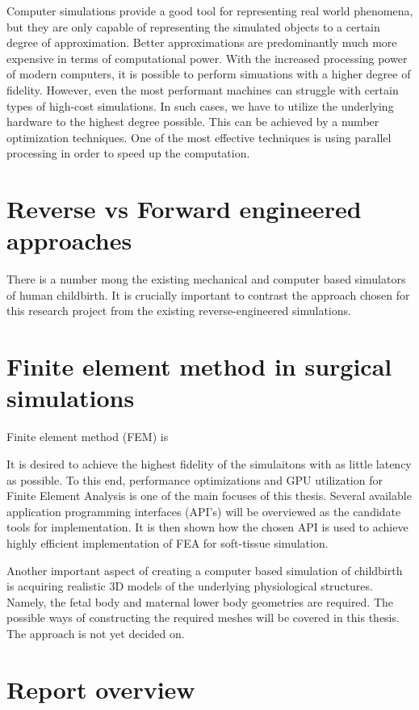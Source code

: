 Computer simulations provide a good tool for representing real world phenomena, but they are only capable of representing the simulated objects to a certain degree of approximation. Better approximations are predominantly much more expensive in terms of computational power. With the increased processing power of modern computers, it is possible to perform simuations with a higher degree of fidelity. However, even the most performant machines can struggle with certain types of high-cost simulations. In such cases, we have to utilize the underlying hardware to the highest degree possible. This can be achieved by a number optimization techniques. One of the most effective techniques is using parallel processing in order to speed up the computation.

\section{Reverse vs Forward engineered approaches}

There is a number mong the existing mechanical and computer based simulators of human childbirth. It is crucially important to contrast the approach chosen for this research project from the existing reverse-engineered simulations.

\section{Finite element method in surgical simulations}

Finite element method (FEM) is

It is desired to achieve the highest fidelity of the simulaitons with as little latency as possible. To this end, performance optimizations and GPU utilization for Finite Element Analysis is one of the main focuses of this thesis. Several available application programming interfaces (API's) will be overviewed as the candidate tools for implementation. It is then shown how the chosen API is used to achieve highly efficient implementation of FEA for soft-tissue simulation.

Another important aspect of creating a computer based simulation of childbirth is acquiring realistic 3D models of the underlying physiological structures. Namely, the fetal body and maternal lower body geometries are required. The possible ways of constructing the required meshes will be covered in this thesis. The approach is not yet decided on.

\section{Report overview}

